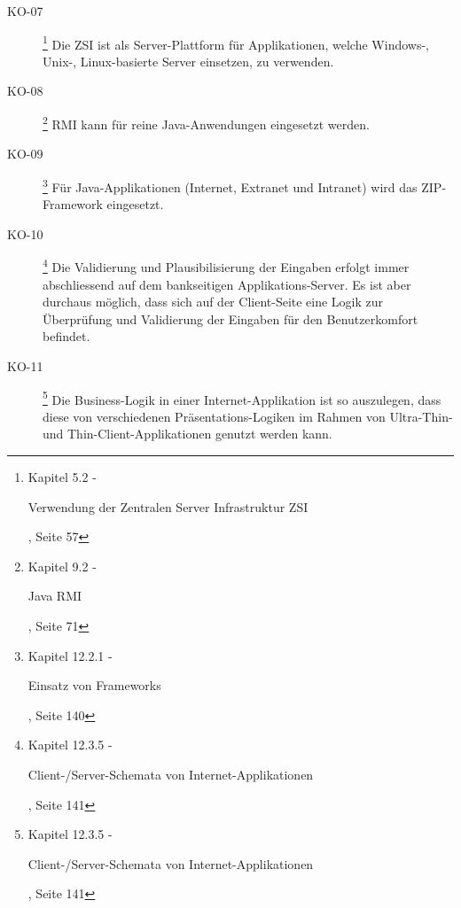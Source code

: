\documentclass[
11pt, %
a4paper, %
BCOR25mm, %
DIV14, %
footsepline = false, %
headsepline, %
twoside, %
openright,
abstracton, %
listof=totocnumbered, %
bibliography=totocnumbered %
]{scrreprt}
\begin{document}
\begin{description}
    \item[KO-07\label{itm:KO-07}]
    \footnote{\cite{ZkbHandbuchDerItArchitektur} Kapitel 5.2 -
    \begin{itshape}Verwendung der Zentralen Server Infrastruktur
    ZSI\end{itshape}, Seite 57}
    Die \ac{ZSI} ist als Server-Plattform für Applikationen, welche Windows-,
    Unix-, Linux-basierte Server einsetzen, zu verwenden.
    
    \item[KO-08\label{itm:KO-08}]
    \footnote{\cite{ZkbHandbuchDerItArchitektur} Kapitel 9.2 -
    \begin{itshape}Java RMI\end{itshape}, Seite 71}
    RMI kann für reine Java-Anwendungen eingesetzt werden.
    
    \item[KO-09\label{itm:KO-09}]
    \footnote{\cite{ZkbHandbuchDerItArchitektur} Kapitel 12.2.1 -
    \begin{itshape}Einsatz von Frameworks\end{itshape}, Seite 140}
    Für Java-Applikationen (Internet, Extranet und Intranet) wird das
    ZIP-Framework eingesetzt.
    
    \item[KO-10\label{itm:KO-10}]
    \footnote{\cite{ZkbHandbuchDerItArchitektur} Kapitel 12.3.5 -
    \begin{itshape}Client-/Server-Schemata von Internet-Applikationen\end{itshape}, Seite 141}
    Die Validierung und Plausibilisierung der Eingaben erfolgt immer
    abschliessend auf dem bankseitigen Applikations-Server. Es ist aber
    durchaus möglich, dass sich auf der Client-Seite eine Logik zur Überprüfung
    und Validierung der Eingaben für den Benutzerkomfort befindet.
    
    \item[KO-11\label{itm:KO-11}]
    \footnote{\cite{ZkbHandbuchDerItArchitektur} Kapitel 12.3.5 -
    \begin{itshape}Client-/Server-Schemata von Internet-Applikationen\end{itshape}, Seite 141}
    Die Business-Logik in einer Internet-Applikation ist so auszulegen, dass
    diese von verschiedenen Präsentations-Logiken im Rahmen von Ultra-Thin- und
    Thin-Client-Applikationen genutzt werden kann.
    

\end{description}
\end{document}
